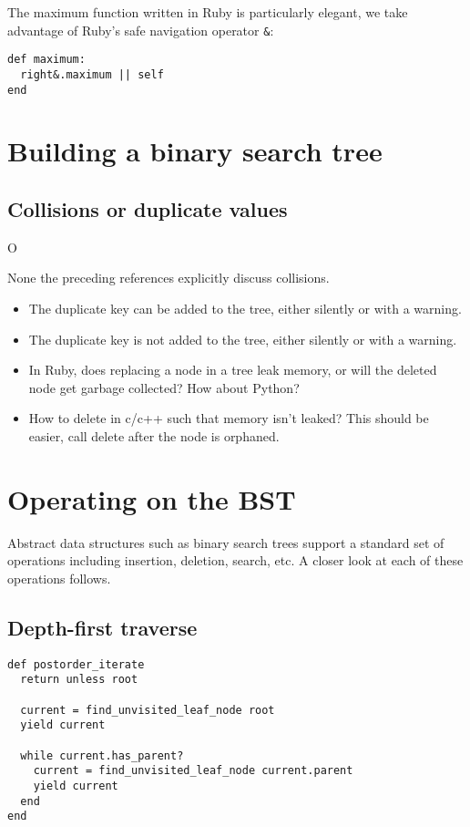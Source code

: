 \documentclass{article}
\begin{document}
\sno The maximum function written in Ruby is particularly elegant,
we take advantage of Ruby's safe navigation operator {\tt \&}:

\begin{lstlisting}[frame=none]
def maximum:
  right&.maximum || self
end
\end{lstlisting}


\section{Building a binary search tree}

\subsection{Collisions or duplicate values}O


None the preceding references explicitly discuss collisions.

\begin{itemize}
\item The duplicate key can be added to the tree, either silently or with a warning.
\item The duplicate key is not added to the tree, either silently or with a warning.

\item In Ruby, does replacing a node in a tree leak memory, or will the deleted node
get garbage collected? How about Python?

\item How to delete in c/c++ such that memory isn't leaked? This should be easier,
call delete after the node is orphaned.
\end{itemize}


\section{Operating on the BST}

Abstract data structures such as binary search trees support a standard
set of operations including insertion, deletion, search, etc. A closer look
at each of these operations follows.

\subsection{Depth-first traverse}

\begin{lstlisting}[frame=single,title=Traverse the tree from the bottom up.]
def postorder_iterate
  return unless root

  current = find_unvisited_leaf_node root
  yield current

  while current.has_parent?
    current = find_unvisited_leaf_node current.parent
    yield current
  end
end
\end{lstlisting}
\end{document}
